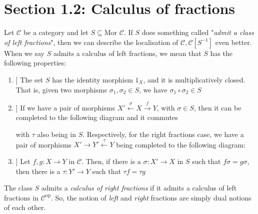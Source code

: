 \documentclass[12pt]{article}
\newcommand{\cat}[1]{\mathscr{#1}}
\begin{document}
\section*{Section 1.2: Calculus of fractions}
Let $\cat{C}$ be a category and let $S\subseteq \text{Mor }\cat{C}$. If $S$ does something called "\textit{admit a class of left fractions}", then we can describe the localisation of $\cat{C}, \cat{C}[S^{-1}]$ even better. When we say $S$ admits a calculus of left fractions, we mean that $S$ has the following properties:
\begin{enumerate}
    \item[[LF1]] The set $S$ has the identity morphism $1_X$, and it is multiplicatively closed. That is, given two morphisms $\sigma_1,\sigma_2\in S$, we have $\sigma_1\circ \sigma_2\in S$ 
    \item[[LF2]] If we have a pair of morphisms $X'\xleftarrow{\sigma}X\xrightarrow{f} Y$, with $\sigma \in S$, then it can be completed to the following diagram and it commutes
    

\begin{center}
\end{center} 
with $\tau$ also being in $S$. Respectively, for the right fractions case, we have a pair of morphisms $X'\to Y'\xleftarrow{\tau}Y $ being completed to the following diagram: 
\begin{center}
\end{center}
\item[[LF3]] Let $f,g:X \to Y$ in $\cat{C}$. Then, if there is a $\sigma:X'\to X$ in $S$ such that $f\sigma =g\sigma $, then there is a $\tau:Y' \to Y$ such that $\tau f=\tau g$
\end{enumerate}

The class $S$ admits a \textit{calculus of right fractions} if it admits a calculus of left fractions in $\cat{C}^{\text{op}}$.
So, the notion of \textit{left} and \textit{right} fractions are simply dual notions of each other. 
\end{document}
